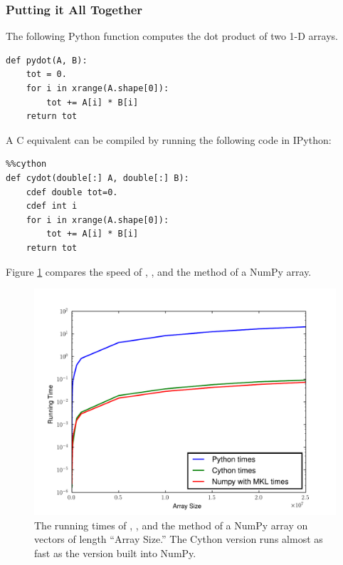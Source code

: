 \subsubsection*{Putting it All Together}
The following Python function computes the dot product of two 1-D arrays.
\begin{lstlisting}
def pydot(A, B):
    tot = 0.
    for i in xrange(A.shape[0]):
        tot += A[i] * B[i]
    return tot
\end{lstlisting}
A C equivalent can be compiled by running the following code in IPython:
\begin{lstlisting}
%%cython
def cydot(double[:] A, double[:] B):
    cdef double tot=0.
    cdef int i
    for i in xrange(A.shape[0]):
        tot += A[i] * B[i]
    return tot
\end{lstlisting}

Figure \ref{cython:dot} compares the speed of , , and the  method of a NumPy array.



\begin{figure}
\centering
\includegraphics[width=\textwidth]{dot.pdf}
\caption{The running times of , , and the  method of a NumPy array on vectors of length ``Array Size.''
The Cython version runs almost as fast as the version built into NumPy.}
\label{cython:dot}
\end{figure}

